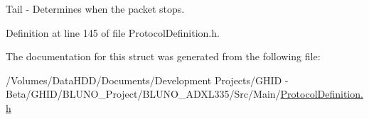 \-Tail -\/ \-Determines when the packet stops. 



\-Definition at line 145 of file \-Protocol\-Definition.\-h.



\-The documentation for this struct was generated from the following file\-:\begin{DoxyCompactItemize}
\item 
/\-Volumes/\-Data\-H\-D\-D/\-Documents/\-Development Projects/\-G\-H\-I\-D -\/ Beta/\-G\-H\-I\-D/\-B\-L\-U\-N\-O\-\_\-\-Project/\-B\-L\-U\-N\-O\-\_\-\-A\-D\-X\-L335/\-Src/\-Main/\hyperlink{_protocol_definition_8h}{\-Protocol\-Definition.\-h}\end{DoxyCompactItemize}
